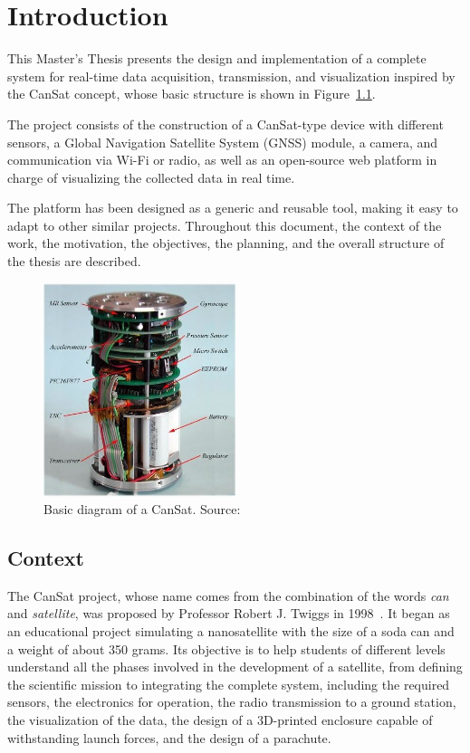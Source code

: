 \chapter{Introduction}
\label{cap:introduction}

This Master's Thesis presents the design and implementation of a complete system for real-time data acquisition, transmission, and visualization inspired by the CanSat concept, whose basic structure is shown in Figure~\ref{fig:cansate}.

The project consists of the construction of a CanSat-type device with different sensors, a Global Navigation Satellite System (GNSS) module, a camera, and communication via Wi-Fi or radio, as well as an open-source web platform in charge of visualizing the collected data in real time.

The platform has been designed as a generic and reusable tool, making it easy to adapt to other similar projects.  
Throughout this document, the context of the work, the motivation, the objectives, the planning, and the overall structure of the thesis are described.

\begin{figure}
    \centering
    \includegraphics[width=0.5\textwidth]{Imagenes/Bitmap/cansat}
    \caption{Basic diagram of a CanSat. Source: \cite{researchgate_cansat2018}}
    \label{fig:cansate}
\end{figure}

\section{Context}
The CanSat project, whose name comes from the combination of the words \emph{can} and \emph{satellite}, was proposed by Professor Robert J. Twiggs in 1998~\cite{jaxa_cansat}.  
It began as an educational project simulating a nanosatellite with the size of a soda can and a weight of about 350 grams.  
Its objective is to help students of different levels understand all the phases involved in the development of a satellite, from defining the scientific mission to integrating the complete system, including the required sensors, the electronics for operation, the radio transmission to a ground station, the visualization of the data, the design of a 3D-printed enclosure capable of withstanding launch forces, and the design of a parachute.

